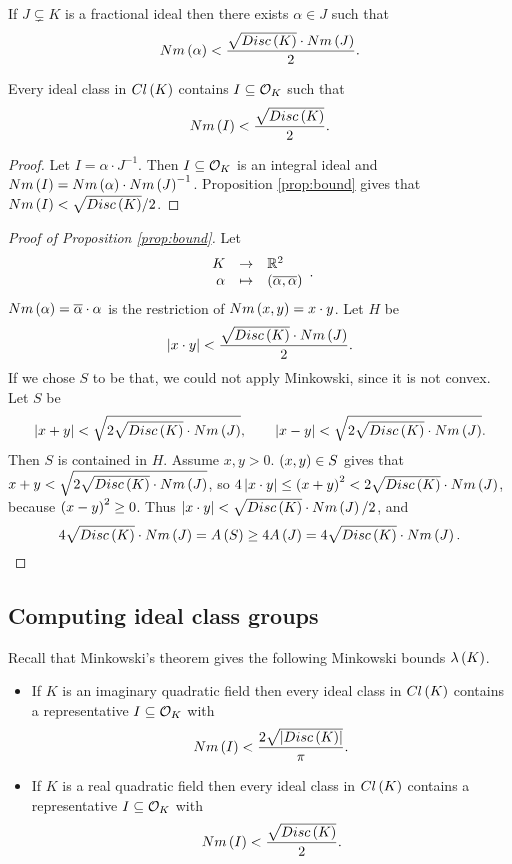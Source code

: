 \begin{proposition}
\label{prop:bound}
If $ J \subsetneq K $ is a fractional ideal then there exists $ \alpha \in J $ such that
$$ Nm\left( \alpha \right) < \dfrac{\sqrt{Disc\left( K \right)} \cdot Nm\left( J \right)}{2}. $$
\end{proposition}

\begin{corollary}
Every ideal class in $ Cl\left( K \right) $ contains $ I \subseteq \mathcal{O}_K $ such that
$$ Nm\left( I \right) < \dfrac{\sqrt{Disc\left( K \right)}}{2}. $$
\end{corollary}

\begin{proof}
Let $ I = \alpha \cdot J^{-1} $. Then $ I \subseteq \mathcal{O}_K $ is an integral ideal and $ Nm\left( I \right) = Nm\left( \alpha \right) \cdot Nm\left( J \right)^{-1} $. Proposition \ref{prop:bound} gives that $ Nm\left( I \right) < \sqrt{Disc\left( K \right)} / 2 $.
\end{proof}

\begin{proof}[Proof of Proposition \ref{prop:bound}]
Let
$$ \function{K}{\R^2}{\alpha}{\rb{\overline{\alpha, \alpha}}}. $$
$ Nm\left( \alpha \right) = \overline{\alpha} \cdot \alpha $ is the restriction of $ Nm\left( x, y \right) = x \cdot y $. Let $ H $ be
$$ \left\lvert x \cdot y \right\rvert < \dfrac{\sqrt{Disc\left( K \right)} \cdot Nm\left( J \right)}{2}. $$
If we chose $ S $ to be that, we could not apply Minkowski, since it is not convex. Let $ S $ be
$$ \left\lvert x + y \right\rvert < \sqrt{2\sqrt{Disc\left( K \right)} \cdot Nm\left( J \right)}, \qquad \left\lvert x - y \right\rvert < \sqrt{2\sqrt{Disc\left( K \right)} \cdot Nm\left( J \right)}. $$
Then $ S $ is contained in $ H $. Assume $ x, y > 0 $. $ \left( x, y \right) \in S $ gives that $ x + y < \sqrt{2\sqrt{Disc\left( K \right)} \cdot Nm\left( J \right)} $, so $ 4\left\lvert x \cdot y \right\rvert \le \left( x + y \right)^2 < 2\sqrt{Disc\left( K \right)} \cdot Nm\left( J \right) $, because $ \left( x - y \right)^2 \ge 0 $. Thus $ \left\lvert x \cdot y \right\rvert < \sqrt{Disc\left( K \right)} \cdot Nm\left( J \right) / 2 $, and
$$ 4\sqrt{Disc\left( K \right)} \cdot Nm\left( J \right) = A\left( S \right) \ge 4A\left( J \right) = 4\sqrt{Disc\left( K \right)} \cdot Nm\left( J \right). $$
\end{proof}

\pagebreak

\subsection{Computing ideal class groups}


Recall that Minkowski's theorem gives the following Minkowski bounds $ \lambda\left( K \right) $.
\begin{itemize}
\item If $ K $ is an imaginary quadratic field then every ideal class in $ Cl\left( K \right) $ contains a representative $ I \subseteq \mathcal{O}_K $ with
$$ Nm\left( I \right) < \dfrac{2\sqrt{\left\lvert Disc\left( K \right) \right\rvert}}{\pi}. $$
\item If $ K $ is a real quadratic field then every ideal class in $ Cl\left( K \right) $ contains a representative $ I \subseteq \mathcal{O}_K $ with
$$ Nm\left( I \right) < \dfrac{\sqrt{Disc\left( K \right)}}{2}. $$
\end{itemize}

